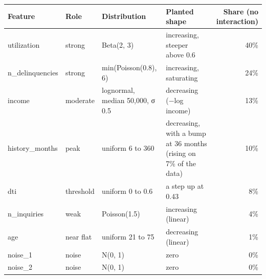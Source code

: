 \begin{tabular}{llp{3.4cm}p{4.6cm}r}
\toprule
\textbf{Feature} & \textbf{Role} & \textbf{Distribution} & \textbf{Planted shape} & \textbf{Share (no interaction)} \\
\midrule
utilization & strong & Beta(2, 3) & increasing, steeper above 0.6 & 40\% \\
n\_delinquencies & strong & min(Poisson(0.8), 6) & increasing, saturating & 24\% \\
income & moderate & lognormal, median 50,000, σ 0.5 & decreasing (−log income) & 13\% \\
history\_months & peak & uniform 6 to 360 & decreasing, with a bump at 36 months (rising on 7\% of the data) & 10\% \\
dti & threshold & uniform 0 to 0.6 & a step up at 0.43 & 8\% \\
n\_inquiries & weak & Poisson(1.5) & increasing (linear) & 4\% \\
age & near flat & uniform 21 to 75 & decreasing (linear) & 1\% \\
noise\_1 & noise & N(0, 1) & zero & 0\% \\
noise\_2 & noise & N(0, 1) & zero & 0\% \\
\bottomrule
\end{tabular}
